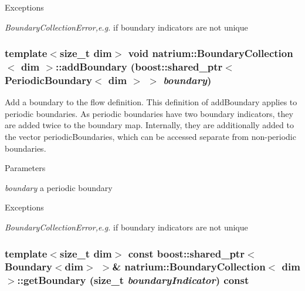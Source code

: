 \begin{DoxyExceptions}{Exceptions}
\item[{\em BoundaryCollectionError,e.g.}]if boundary indicators are not unique \end{DoxyExceptions}
\hypertarget{classnatrium_1_1BoundaryCollection_a9f957b5338bca01c7bd8c21576ec922c}{
\subsubsection[{addBoundary}]{\setlength{\rightskip}{0pt plus 5cm}template$<$size\_\-t dim$>$ void {\bf natrium::BoundaryCollection}$<$ dim $>$::addBoundary (boost::shared\_\-ptr$<$ {\bf PeriodicBoundary}$<$ dim $>$ $>$ {\em boundary})}}
\label{classnatrium_1_1BoundaryCollection_a9f957b5338bca01c7bd8c21576ec922c}


Add a boundary to the flow definition. This definition of addBoundary applies to periodic boundaries. As periodic boundaries have two boundary indicators, they are added twice to the boundary map. Internally, they are additionally added to the vector periodicBoundaries, which can be accessed separate from non-\/periodic boundaries. 
\begin{DoxyParams}{Parameters}
\item[{\em boundary}]a periodic boundary \end{DoxyParams}

\begin{DoxyExceptions}{Exceptions}
\item[{\em BoundaryCollectionError,e.g.}]if boundary indicators are not unique \end{DoxyExceptions}
\hypertarget{classnatrium_1_1BoundaryCollection_a44816fa48b8100fb37b8ad7491c2cc6c}{
\subsubsection[{getBoundary}]{\setlength{\rightskip}{0pt plus 5cm}template$<$size\_\-t dim$>$ const boost::shared\_\-ptr$<${\bf Boundary}$<$dim$>$ $>$\& {\bf natrium::BoundaryCollection}$<$ dim $>$::getBoundary (size\_\-t {\em boundaryIndicator}) const}}
\label{classnatrium_1_1BoundaryCollection_a44816fa48b8100fb37b8ad7491c2cc6c}


